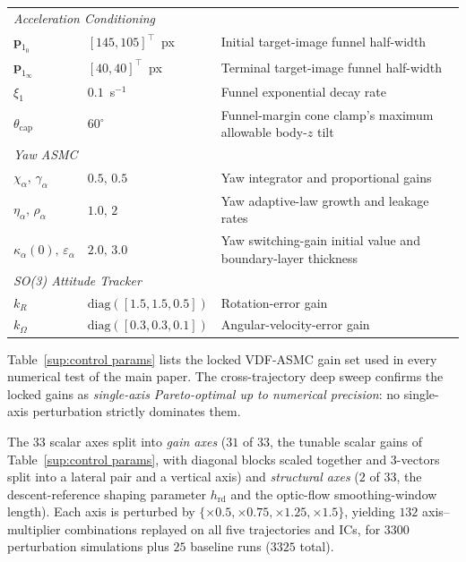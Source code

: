 \documentclass[10pt,journal]{IEEEtran}
\begin{document}
\begin{table}[!t]
\begin{tabular}{p{} p{} p{}}
    \midrule
        \multicolumn{3}{l}{\textit{Acceleration Conditioning}} \\
        $\boldsymbol{p}_{1_0}$      & $[145,105]^\top$~px & Initial target-image funnel half-width \\
        $\boldsymbol{p}_{1_\infty}$ & $[40,40]^\top$~px & Terminal target-image funnel half-width \\
        $\xi_1$                     & $0.1$~s$^{-1}$ & Funnel exponential decay rate \\
        $\theta_\text{cap}$         & $60^\circ$ & Funnel-margin cone clamp's maximum allowable body-$z$ tilt \\
    \midrule
        \multicolumn{3}{l}{\textit{Yaw ASMC}} \\
        $\chi_\alpha,\,\gamma_\alpha$       & $0.5,\,0.5$ & Yaw integrator and proportional gains \\
        $\eta_\alpha,\,\rho_\alpha$         & $1.0,\,2$ & Yaw adaptive-law growth and leakage rates \\
        $\kappa_{\alpha}(0),\,\varepsilon_\alpha$ & $2.0,\,3.0$ & Yaw switching-gain initial value and boundary-layer thickness \\
    \midrule
        \multicolumn{3}{l}{\textit{SO(3) Attitude Tracker}} \\
        $k_R$      & $\text{diag}([1.5,1.5,0.5])$ & Rotation-error gain \\
        $k_\Omega$ & $\text{diag}([0.3,0.3,0.1])$ & Angular-velocity-error gain \\
    \bottomrule
    \end{tabular}
\end{table}

Table~\ref{sup:control params} lists the locked VDF-ASMC gain set used in every numerical test of the main paper. The cross-trajectory deep sweep confirms the locked gains as \emph{single-axis Pareto-optimal up to numerical precision}: no single-axis perturbation strictly dominates them.

The $33$ scalar axes split into \emph{gain axes} ($31$ of $33$, the tunable scalar gains of Table~\ref{sup:control params}, with diagonal blocks scaled together and 3-vectors split into a lateral pair and a vertical axis) and \emph{structural axes} ($2$ of $33$, the descent-reference shaping parameter $h_\text{rd}$ and the optic-flow smoothing-window length). Each axis is perturbed by $\{\times 0.5,\times 0.75,\times 1.25,\times 1.5\}$, yielding $132$ axis--multiplier combinations replayed on all five trajectories and ICs, for $3300$ perturbation simulations plus $25$ baseline runs ($3325$ total).
\end{document}
